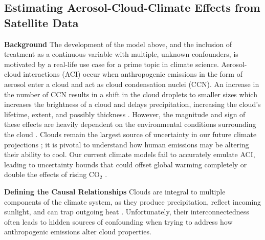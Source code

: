 \subsection{Estimating Aerosol-Cloud-Climate Effects from Satellite Data}
\label{sec:clouds}
\textbf{Background}
The development of the model above, and the inclusion of treatment as a continuous variable with multiple, unknown confounders, is motivated by a real-life use case for a prime topic in climate science. Aerosol-cloud interactions (ACI) occur when anthropogenic emissions in the form of aerosol enter a cloud and act as cloud condensation nuclei (CCN). An increase in the number of CCN results in a shift in the cloud droplets to smaller sizes which increases the brightness of a cloud and delays precipitation, increasing the cloud's lifetime, extent, and possibly thickness \citep{twomey1977influence, albrecht1989aerosols, toll2017volcano}. However, the magnitude and sign of these effects are heavily dependent on the environmental conditions surrounding the cloud \citep{douglas2020quantifying}. Clouds remain the largest source of uncertainty in our future climate projections \citep{ipcc6ts}; it is pivotal to understand how human emissions may be altering their ability to cool. Our current climate models fail to accurately emulate ACI, leading to uncertainty bounds that could offset global warming completely or double the effects of rising CO\(_{2}\) \citep{boucher2013clouds}.

\textbf{Defining the Causal Relationships}
Clouds are integral to multiple components of the climate system, as they produce precipitation, reflect incoming sunlight, and can trap outgoing heat \citep{stevens2009untangling}. Unfortunately, their interconnectedness often leads to hidden sources of confounding when trying to address how anthropogenic emissions alter cloud properties.

